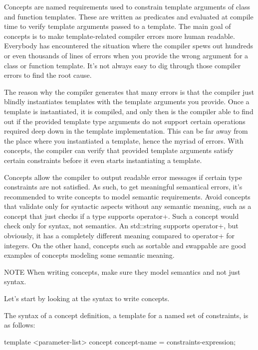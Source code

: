 
Concepts are named requirements used to constrain template arguments of class and function templates. These are written as predicates and evaluated at compile time to verify template arguments passed to a template. The main goal of concepts is to make template-related compiler errors more human readable. Everybody has encountered the situation where the compiler spews out hundreds or even thousands of lines of errors when you provide the wrong argument for a class or function template. It’s not always easy to dig through those compiler errors to find the root cause.

The reason why the compiler generates that many errors is that the compiler just blindly instantiates templates with the template arguments you provide. Once a template is instantiated, it is compiled, and only then is the compiler able to find out if the provided template type arguments do not support certain operations required deep down in the template implementation. This can be far away from the place where you instantiated a template, hence the myriad of errors. With concepts, the compiler can verify that provided template arguments satisfy certain constraints before it even starts instantiating a template.

Concepts allow the compiler to output readable error messages if certain type constraints are not satisfied. As such, to get meaningful semantical errors, it’s recommended to write concepts to model semantic requirements. Avoid concepts that validate only for syntactic aspects without any semantic meaning, such as a concept that just checks if a type supports operator+. Such a concept would check only for syntax, not semantics. An std::string supports operator+, but obviously, it has a completely different meaning compared to operator+ for integers. On the other hand, concepts such as sortable and swappable are good examples of concepts modeling some semantic meaning.

\begin{myNotic}{NOTE}
When writing concepts, make sure they model semantics and not just syntax.
\end{myNotic}

Let’s start by looking at the syntax to write concepts.


The syntax of a concept definition, a template for a named set of constraints, is as follows:

\begin{cpp}
template <parameter-list>
concept concept-name = constraints-expression;
\end{cpp}

